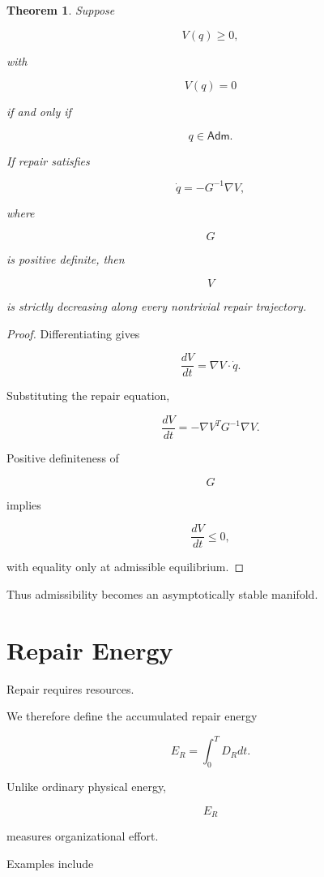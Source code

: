 \documentclass[11pt,oneside]{book}
\numberwithin{equation}{chapter}
\theoremstyle{definition}
\theoremstyle{plain}
\newtheorem{theorem}[definition]{Theorem}
\newcommand{\Adm}{\mathsf{Adm}}
\begin{document}
\begin{theorem}

Suppose

\[
V(q)\ge0,
\]

with

\[
V(q)=0
\]

if and only if

\[
q
\in
\Adm.
\]

If repair satisfies

\[
\dot q
=
-
G^{-1}\nabla V,
\]

where

\[
G
\]

is positive definite, then

\[
V
\]

is strictly decreasing along every nontrivial repair trajectory.

\end{theorem}

\begin{proof}

Differentiating gives

\[
\frac{dV}{dt}
=
\nabla V
\cdot
\dot q.
\]

Substituting the repair equation,

\[
\frac{dV}{dt}
=
-
\nabla V^{T}
G^{-1}
\nabla V.
\]

Positive definiteness of

\[
G
\]

implies

\[
\frac{dV}{dt}
\le0,
\]

with equality only at admissible equilibrium.

\end{proof}

Thus admissibility becomes an asymptotically stable manifold.

\section{Repair Energy}

Repair requires resources.

We therefore define the accumulated repair energy

\[
E_R
=
\int_0^T
D_R
dt.
\]

Unlike ordinary physical energy,

\[
E_R
\]

measures organizational effort.

Examples include
\end{document}
